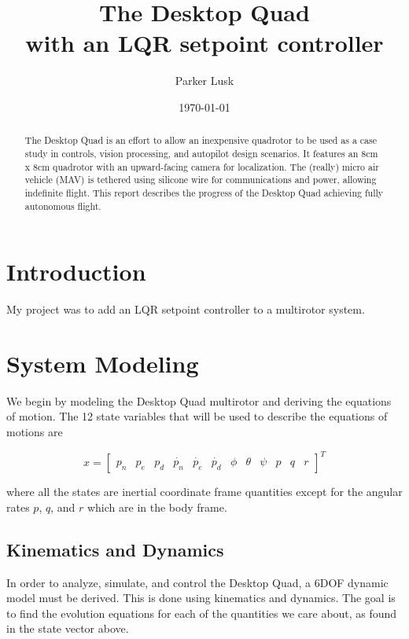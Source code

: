 \documentclass[dvips,12pt]{article}
\begin{document}
\title{\LARGE The Desktop Quad \\ \large with an LQR setpoint controller }
\author{Parker Lusk}
\date{\today}
\maketitle

\begin{abstract}
	The Desktop Quad is an effort to allow an inexpensive quadrotor to be used as a case study in controls, vision processing, and autopilot design scenarios. It features an 8cm x 8cm quadrotor with an upward-facing camera for localization. The (really) micro air vehicle (MAV) is tethered using silicone wire for communications and power, allowing indefinite flight. This report describes the progress of the Desktop Quad achieving fully autonomous flight.
\end{abstract}

\doublespacing
\section{Introduction}
My project was to add an LQR setpoint controller to a multirotor system.

\section{System Modeling}
We begin by modeling the Desktop Quad multirotor and deriving the equations of motion. The 12 state variables that will be used to describe the equations of motions are

\begin{equation*}
x =
\begin{bmatrix}
p_n & p_e & p_d & \dot{p_n} & \dot{p_e} & \dot{p_d} & \phi & \theta & \psi & p & q & r
\end{bmatrix}
^T
\end{equation*}

\noindent where all the states are inertial coordinate frame quantities except for the angular rates $p$, $q$, and $r$ which are in the body frame.

\subsection{Kinematics and Dynamics}
In order to analyze, simulate, and control the Desktop Quad, a 6DOF dynamic model must be derived. This is done using kinematics and dynamics. The goal is to find the evolution equations for each of the quantities we care about, as found in the state vector above.
\end{document}
